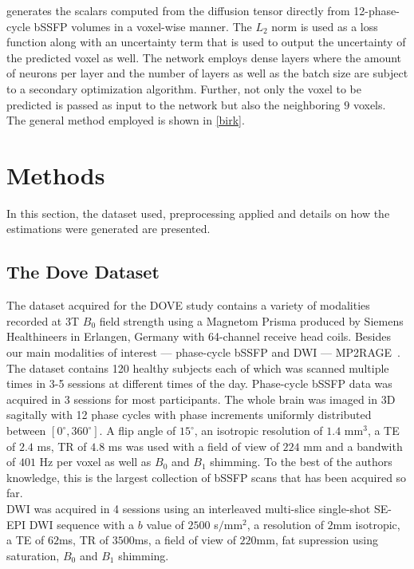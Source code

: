\autocite{birk_high-resolution_2022} generates the scalars computed from the diffusion tensor directly from 12-phase-cycle bSSFP volumes in a voxel-wise manner.
The $L_2$ norm is used as a loss function along with an uncertainty term that is used to output the uncertainty of the predicted voxel as well.
The network employs dense layers where the amount of neurons per layer and the number of layers as well as the batch size are subject to a secondary optimization algorithm.
Further, not only the voxel to be predicted is passed as input to the network but also the neighboring $9$ voxels.
The general method employed is shown in \ref{birk}.




\newpage

\chapter{Methods}\label{\positionnumber} 
In this section, the dataset used, preprocessing applied and details on how the estimations were generated are presented.
\section{The Dove Dataset}
The dataset acquired for the DOVE study contains a variety of modalities recorded at 3T $B_0$ field strength using a Magnetom Prisma produced by Siemens Healthineers in Erlangen, Germany with 64-channel receive head coils.
Besides our main modalities of interest --- phase-cycle bSSFP and DWI --- MP2RAGE~\autocite{marques_mp2rage_2010}. \\

The dataset contains 120 healthy subjects each of which was scanned multiple times in 3-5 sessions at different times of the day.
Phase-cycle bSSFP data was acquired in 3 sessions for most participants.
The whole brain was imaged in 3D sagitally with 12 phase cycles with phase increments uniformly distributed between $[0^\circ, 360^\circ]$.
A flip angle of $15^\circ$, an isotropic resolution of $1.4$ mm$^3$, a TE of $2.4$ ms, TR of $4.8$ ms was used with a field of view of $224$ mm and a bandwith of $401$ Hz per voxel as well as $B_0$ and $B_1$ shimming.
To the best of the authors knowledge, this is the largest collection of bSSFP scans that has been acquired so far. \\

DWI was acquired in 4 sessions using an interleaved multi-slice single-shot SE-EPI DWI sequence with a $b$ value of $2500$ s$/$mm$^2$, a resolution of $2$mm isotropic, a TE of $62$ms, TR of $3500$ms, a field of view of $220$mm, fat supression using saturation, $B_0$ and $B_1$ shimming. \\

